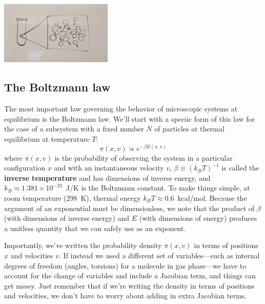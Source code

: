 \documentclass[english,course]{lecture}
\begin{document}
\begin{centering}
\includegraphics[width=0.4\textwidth]{figures/many-particles.jpg}

\end{centering}


\subsection{The Boltzmann law} 

The most important law governing the behavior of microscopic systems at equilibrium is the Boltzmann law.
We'll start with a speciic form of this law for the case of a subsystem with a fixed number $N$ of particles at thermal equilibrium at temperature $T$:
\begin{equation}
\pi(x,v) \propto e^{-\beta E(x,v)} \label{equation:boltzmann-law}
\end{equation}
where $\pi(x,v)$ is the probability of observing the system in a particular configuration $x$ and with an instantaneous velocity $v$, $\beta \equiv (k_B T)^{-1}$ is called the {\bf inverse temperature} and has dimensions of inverse energy, and $k_B \approx 1.381 \times 10^{-23}$~J/K is the Boltzmann constant.
To make things simple, at room temperature (298~K), thermal energy $k_B T \approx 0.6$~kcal/mol.
Because the argument of an exponential must be dimensionless, we note that the product of $\beta$ (with dimensions of inverse energy) and $E$ (with dimensions of energy) produces a unitless quantity that we can safely use as an exponent.

Importantly, we've written the probability density $\pi(x,v)$ in terms of positions $x$ and velocities $v$.
If instead we used a different set of variables---such as internal degrees of freedom (angles, torsions) for a molecule in gas phase---we have to account for the change of variables and include a Jacobian term, and things can get messy.
Just remember that if we're writing the density in terms of positions and velocities, we don't have to worry about adding in extra Jacobian terms.
\end{document}
